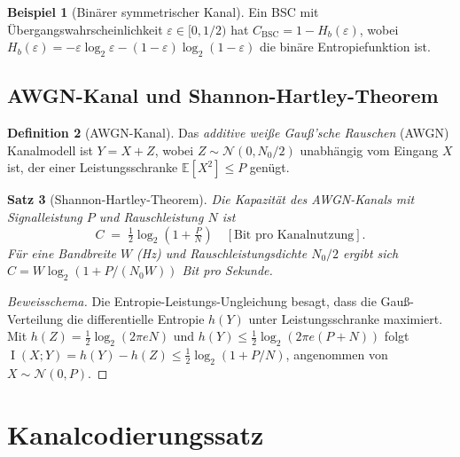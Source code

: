 \documentclass[12pt,a4paper]{amsart}
\newtheorem{theorem}{Satz}[section]
\theoremstyle{definition}
\newtheorem{definition}[theorem]{Definition}
\newtheorem{beispiel}[theorem]{Beispiel}
\theoremstyle{remark}
\DeclareMathOperator{\MI}{I}
\newcommand{\E}{\mathbb{E}}
\begin{document}
\begin{beispiel}[Binärer symmetrischer Kanal]
Ein BSC mit Übergangswahrscheinlichkeit $\varepsilon \in [0,1/2)$ hat
$C_{\mathrm{BSC}} = 1 - H_b(\varepsilon)$, wobei $H_b(\varepsilon) =
-\varepsilon\log_2\varepsilon - (1-\varepsilon)\log_2(1-\varepsilon)$
die binäre Entropiefunktion ist.
\end{beispiel}

\subsection{AWGN-Kanal und Shannon-Hartley-Theorem}

\begin{definition}[AWGN-Kanal]
Das \emph{additive weiße Gauß'sche Rauschen} (AWGN) Kanalmodell ist
$Y = X + Z$, wobei $Z \sim \mathcal{N}(0, N_0/2)$ unabhängig vom Eingang $X$
ist, der einer Leistungsschranke $\E[X^2] \leq P$ genügt.
\end{definition}

\begin{theorem}[Shannon-Hartley-Theorem]\label{satz:shannon-hartley}
Die Kapazität des AWGN-Kanals mit Signalleistung $P$ und Rauschleistung $N$ ist
\begin{equation}\label{eq:awgn}
  C \;=\; \tfrac{1}{2}\log_2\!\left(1 + \tfrac{P}{N}\right)
  \quad [\text{Bit pro Kanalnutzung}].
\end{equation}
Für eine Bandbreite $W$ (Hz) und Rauschleistungsdichte $N_0/2$ ergibt sich
$C = W \log_2(1 + P/(N_0 W))$ Bit pro Sekunde.
\end{theorem}
\begin{proof}[Beweisschema]
Die Entropie-Leistungs-Ungleichung besagt, dass die Gauß-Verteilung die
differentielle Entropie $h(Y)$ unter Leistungsschranke maximiert. Mit
$h(Z) = \frac{1}{2}\log_2(2\pi e N)$ und $h(Y) \leq \frac{1}{2}\log_2(2\pi
e(P+N))$ folgt $\MI(X;Y) = h(Y) - h(Z) \leq \frac{1}{2}\log_2(1+P/N)$,
angenommen von $X \sim \mathcal{N}(0,P)$.
\end{proof}

\section{Kanalcodierungssatz}
\end{document}
